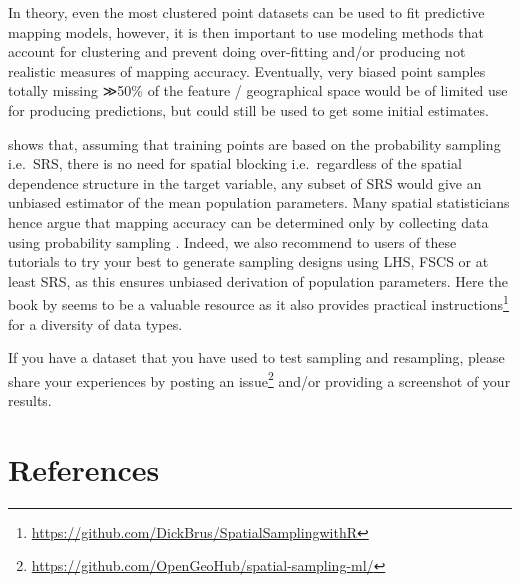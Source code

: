 \documentclass[
  graybox,natbib,nospthms]{svmono}
\renewcommand{\href}[2]{#2 (\url{#1})}
\renewcommand{\href}[2]{#2\footnote{\url{#1}}}
\begin{document}
In theory, even the most clustered point datasets can be used to fit predictive mapping models,
however, it is then important to use modeling methods that account for clustering and
prevent doing over-fitting and/or producing not realistic measures of mapping accuracy.
Eventually, very biased point samples totally missing ≫50\% of the feature / geographical
space would be of limited use for producing predictions, but could still be used to
get some initial estimates.

\citet{Wadoux2021EM} shows that, assuming that training points are based on the probability
sampling i.e.~SRS, there is no need for spatial blocking i.e.~regardless of the
spatial dependence structure in the target variable, any subset of SRS would give an
unbiased estimator of the mean population parameters. Many spatial statisticians
hence argue that mapping accuracy can be determined only by collecting data
using probability sampling \citep{Brus2011EJSS}. Indeed, we also recommend to users of these tutorials
to try your best to generate sampling designs using LHS, FSCS or at least SRS,
as this ensures unbiased derivation of population parameters. Here the book by
\citet{Brus2021sampling} seems to be a valuable resource as it also provides
\href{https://github.com/DickBrus/SpatialSamplingwithR}{practical instructions} for a diversity of data types.

If you have a dataset that you have used to test sampling and resampling, please
share your experiences by posting \href{https://github.com/OpenGeoHub/spatial-sampling-ml/}{an issue} and/or providing a screenshot of your results.

\hypertarget{references}{%
\chapter{References}\label{references}}

  

\backmatter
\printindex
\end{document}

